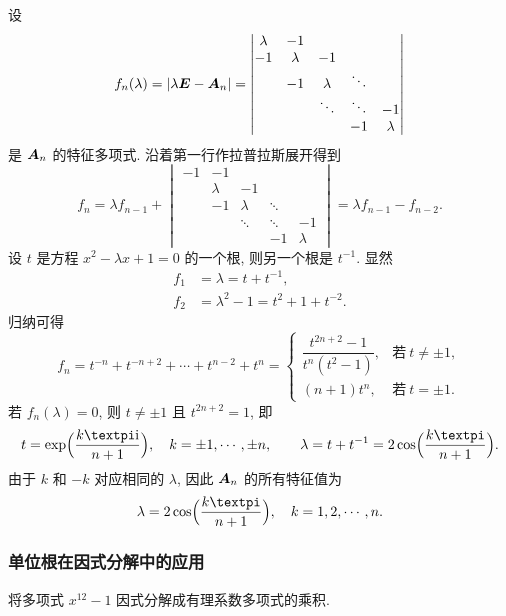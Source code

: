 \begin{solution}
  设
  \[
     f_n(\lambda)
    =\lvert\lambda{\boldsymbol{E}}-{\boldsymbol{A}}_n\rvert
    =\begin{vmatrix}
      \lambda&-1&&&\\
      -1&\lambda&-1&&\\
      &-1&\lambda&\ddots&\\
      &&\ddots&\ddots &-1\\
      &&&-1&\lambda
    \end{vmatrix}
  \]
  是 ${\boldsymbol{A}}_n$ 的特征多项式.
  沿着第一行作拉普拉斯展开得到
  \[
    f_n=\lambda f_{n-1}+\begin{vmatrix}
      -1&-1&&&\\
      &\lambda&-1&&\\
      &-1&\lambda&\ddots&\\
      &&\ddots&\ddots&-1\\
      &&&-1&\lambda
    \end{vmatrix}
    =\lambda f_{n-1}-f_{n-2}.
  \]
  设 $t$ 是方程 $x^2-\lambda x+1=0$ 的一个根, 则另一个根是 $t^{-1}$.
  显然
  \begin{align*}
    f_1&=\lambda=t+t^{-1},\\
    f_2&=\lambda^2-1=t^2+1+t^{-2}.
  \end{align*}
  归纳可得
  \[
     f_n
    =t^{-n}+t^{-n+2}+\cdots+t^{n-2}+t^n
    =\begin{cases}
      \dfrac{t^{2n+2}-1}{t^n(t^2-1)},&\text{若}\ t\neq \pm1,\\
      (n+1)t^n,&\text{若}\ t=\pm1.
    \end{cases}
  \]
  若 $f_n(\lambda)=0$, 则 $t\neq \pm1$ 且 $t^{2n+2}=1$, 即
  \[
    t=\exp\Bigl(\frac{k\cpi\ii}{n+1}\Bigr),\quad
    k=\pm 1,\cdots,\pm n,\qquad
    \lambda=t+t^{-1}=2\cos\Bigl(\frac{k\cpi}{n+1}\Bigr).
  \]
  由于 $k$ 和 $-k$ 对应相同的 $\lambda$, 因此 ${\boldsymbol{A}}_n$ 的所有特征值为
  \[
    \lambda=2\cos\Bigl(\frac{k\cpi}{n+1}\Bigr),
    \quad k=1,2,\cdots,n.
  \]
\end{solution}



\subsubsection{单位根在因式分解中的应用}

\begin{example}
  将多项式 $x^{12}-1$ 因式分解成有理系数多项式的乘积.
\end{example}

